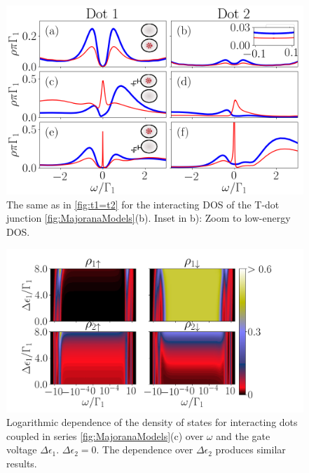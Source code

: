 \begin{figure}[bt]
\begin{center}
\includegraphics[scale=0.4]{IMAGES/NRG/t1>0.png}
\caption{  \label{fig:Nt1>0} The same as in \ref{fig:t1=t2} for the  interacting DOS of the T-dot junction \ref{fig:MajoranaModels}(b). Inset in b): Zoom to low-energy DOS. \protect\Source{}
}
%
\end{center}
\end{figure}

\begin{figure}[H]
    \centering
    \includegraphics[scale=0.4]{IMAGES/NRG/c)LogEv-ed1.png}
    \caption{\label{fig:logc}  Logarithmic dependence of the density of states for interacting dots coupled in series  \ref{fig:MajoranaModels}(c) over $\omega$ and the gate voltage $\Delta \epsilon_1$. $\Delta \epsilon_2=0$. The dependence over $\Delta \epsilon_2$ produces similar results. \protect\Source{}}
\end{figure}



